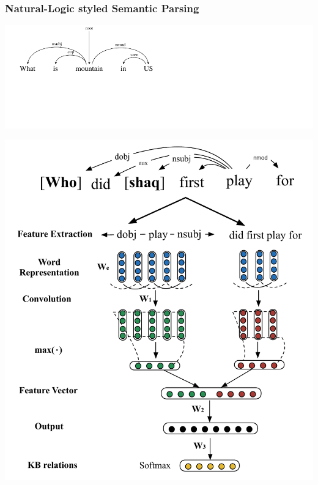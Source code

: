 \documentclass[mathserif,12pt]{beamer}
\begin{document}
\begin{frame}
\frametitle{Natural-Logic styled Semantic Parsing}
\includegraphics[trim=-12em 0em 0em 0em,clip=true,scale=0.7]{figures/natural-logic-argmax1}

\vspace{-4em}
\includegraphics[trim=-12em 0em 0em 0em,clip=true,scale=0.4]{figures/MCCNN}
\end{frame}
\end{document}
